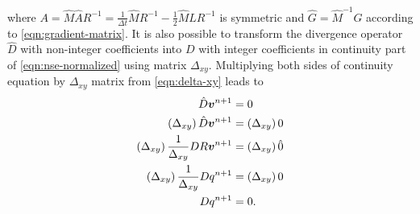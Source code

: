 \documentclass{article}
\numberwithin{equation}{section}
\begin{document}
where $A=\hat{M}\hat{A}R^{-1}=\frac{1}{\Delta t}\hat{M}R^{-1}-\frac{1}{2}\hat{M}\hat{L}R^{-1}$ is symmetric and $\hat{G}=\hat{M}^{-1}G$ according to \cref{eqn:gradient-matrix}. It is also possible to transform the divergence operator $\hat{D}$ with non-integer coefficients into $D$ with integer coefficients in continuity part of \cref{eqn:nse-normalized} using  matrix $\Delta_{xy}$. Multiplying both sides of continuity equation by $\Delta _{xy}$ matrix from \cref{eqn:delta-xy} leads to 
\begin{align*}
	\hat{D}\boldsymbol{v}^{n+1}&= 0\notag\\
	\left(\Delta_{xy} \right)\hat{D}\boldsymbol{v}^{n+1}&=\left ( \Delta_{xy}\right ) 0\notag\\
	\left(\Delta_{xy}\right)\frac{1}{\Delta _{xy}}{D}R\boldsymbol{v}^{n+1}&=\left ( \Delta_{xy}\right ) \hat0\notag\\
	\left(\Delta_{xy}\right)\frac{1}{\Delta_{xy}}{D}q^{n+1}&=\left ( \Delta_{xy}\right ) 0\notag\\
	D{q}^{n+1}&=0.
\end{align*}

\end{document}
